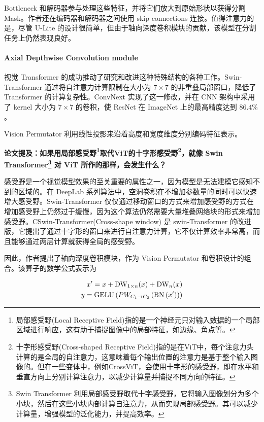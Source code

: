\documentclass[a4paper, 10pt]{article}
\begin{document}
			Bottleneck 和解码器参与处理这些特征，并将它们放大到原始形状以获得分割 Mask。作者还在编码器和解码器之间使用 skip connections 连接。值得注意力的是，尽管 U-Lite 的设计很简单，但由于轴向深度卷积模块的贡献，该模型在分割任务上仍然表现良好。
			
			\paragraph{Axial Depthwise Convolution module}
			
			视觉 Transformer 的成功推动了研究和改进这种特殊结构的各种工作。Swin-Transformer 通过将自注意力计算限制在大小为 $7 \times 7$ 的非重叠局部窗口，降低了 Transformer 的计算复杂性。ConvNext 实现了这一修改，并在 CNN 架构中采用了 kernel 大小为 $7 \times 7$ 的卷积，使 ResNet 在 ImageNet 上的最高精度达到 $86.4\%$。
			
			Vision Permutator 利用线性投影来沿着高度和宽度维度分别编码特征表示。
			
			\textbf{论文提及：如果用局部感受野\footnote{局部感受野(Local Receptive Field)指的是一个神经元只对输入数据的一个局部区域进行响应，这有助于捕捉图像中的局部特征，如边缘、角点等。}取代ViT的十字形感受野\footnote{十字形感受野(Cross-shaped Receptive Field)指的是在ViT中，每个注意力头计算的是全局的自注意力，这意味着每个输出位置的注意力是基于整个输入图像的。但在一些变体中，例如CrossViT，会使用十字形的感受野，即在水平和垂直方向上分别计算注意力，以减少计算量并捕捉不同方向的特征。}，就像 Swin Transformer\footnote{Swin Transformer 利用局部感受野取代十字感受野，它将输入图像划分为多个小块，然后在这些小块内部计算自注意力，从而实现局部感受野。其可以减少计算量，增强模型的泛化能力，并提高效率。} 对 ViT 所作的那样，会发生什么？}
			
			感受野是一个视觉模型效果的至关重要的属性之一，因为模型是无法建模它感知不到的区域的。在 DeepLab 系列算法中，空洞卷积在不增加参数量的同时可以快速增大感受野。Swin-Transformer\cite{liu2021swin} 仅仅通过移动窗口的方式来增加感受野的方式在增加感受野上仍然过于缓慢，因为这个算法仍然需要大量堆叠网络块的形式来增加感受野。CSwin-Transformer(Cross-shape window)\cite{dong2022cswin} 是 swin-Transformer 的改进版，它提出了通过十字形的窗口来进行自注意力计算，它不仅计算效率非常高，而且能够通过两层计算就获得全局的感受野。
			
			因此，作者提出了轴向深度卷积模块，作为 Vision Permutator 和卷积设计的组合。该算子的数学公式表示为
			
			\begin{equation}
				\begin{aligned}
					x^\prime = x + \text{DW}_{1 \times n}(x) + \text{DW}_{n \time 1}(x) \\
					y = \text{GELU}\left(PW_{C_1 \rightarrow C_2} \left(\text{BN}\left(x^\prime \right)\right)\right)
				\end{aligned}
				\label{eq: Axial Depthwise Convolution module}
			\end{equation}
			
\end{document}

